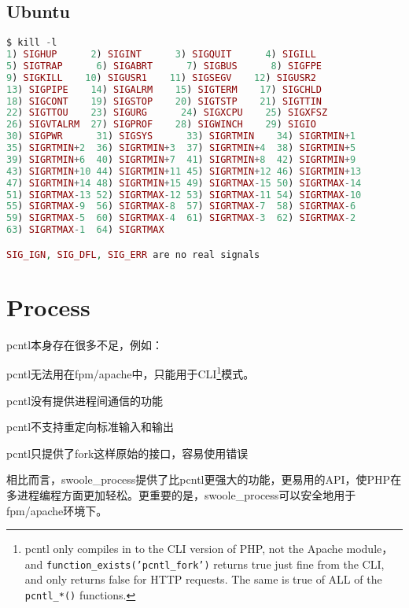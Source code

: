 \subsection{Ubuntu}


\begin{lstlisting}[language=PHP]
$ kill -l
1) SIGHUP      2) SIGINT      3) SIGQUIT      4) SIGILL
5) SIGTRAP      6) SIGABRT      7) SIGBUS      8) SIGFPE
9) SIGKILL    10) SIGUSR1    11) SIGSEGV    12) SIGUSR2
13) SIGPIPE    14) SIGALRM    15) SIGTERM    17) SIGCHLD
18) SIGCONT    19) SIGSTOP    20) SIGTSTP    21) SIGTTIN
22) SIGTTOU    23) SIGURG      24) SIGXCPU    25) SIGXFSZ
26) SIGVTALRM  27) SIGPROF    28) SIGWINCH    29) SIGIO
30) SIGPWR      31) SIGSYS      33) SIGRTMIN    34) SIGRTMIN+1
35) SIGRTMIN+2  36) SIGRTMIN+3  37) SIGRTMIN+4  38) SIGRTMIN+5
39) SIGRTMIN+6  40) SIGRTMIN+7  41) SIGRTMIN+8  42) SIGRTMIN+9
43) SIGRTMIN+10 44) SIGRTMIN+11 45) SIGRTMIN+12 46) SIGRTMIN+13
47) SIGRTMIN+14 48) SIGRTMIN+15 49) SIGRTMAX-15 50) SIGRTMAX-14
51) SIGRTMAX-13 52) SIGRTMAX-12 53) SIGRTMAX-11 54) SIGRTMAX-10
55) SIGRTMAX-9  56) SIGRTMAX-8  57) SIGRTMAX-7  58) SIGRTMAX-6
59) SIGRTMAX-5  60) SIGRTMAX-4  61) SIGRTMAX-3  62) SIGRTMAX-2
63) SIGRTMAX-1  64) SIGRTMAX

SIG_IGN, SIG_DFL, SIG_ERR are no real signals
\end{lstlisting}


\section{Process}


pcntl本身存在很多不足，例如：

\begin{compactitem}
\item pcntl无法用在fpm/apache中，只能用于CLI\footnote{pcntl only compiles in to the CLI version of PHP, not the Apache module，and \texttt{function_exists('pcntl\_fork')} returns true just fine from the CLI, and only returns false for HTTP requests. The same is true of ALL of the \texttt{pcntl\_*()} functions.}模式。

\item pcntl没有提供进程间通信的功能
\item pcntl不支持重定向标准输入和输出
\item pcntl只提供了fork这样原始的接口，容易使用错误
\end{compactitem}

相比而言，swoole\_process提供了比pcntl更强大的功能，更易用的API，使PHP在多进程编程方面更加轻松。更重要的是，swoole\_process可以安全地用于fpm/apache环境下。

